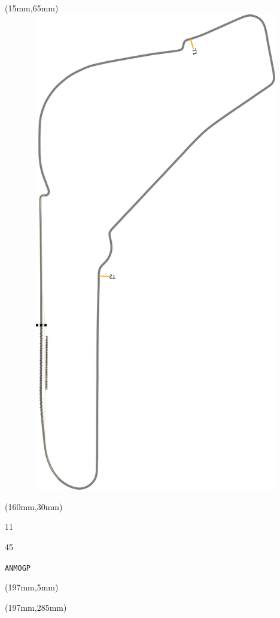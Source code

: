\begin{textblock*}{185mm}(15mm,65mm)%
\centering
\mbox{\includegraphics[width=185mm,height=210mm,keepaspectratio]{PT/ANMOGP.pdf}}
\end{textblock*}
\begin{textblock*}{40mm}(160mm,30mm)%
\Large
\par{} 
\par11 
\par45 
\par\hfill\tiny\tt ANMOGP\\
\end{textblock*}
\begin{textblock*}{20mm}(197mm,5mm)%
\fbox{\thepage}
\label{ANMOGP}
\end{textblock*}
\begin{textblock*}{20mm}(197mm,285mm)%
\fbox{\thepage}
\end{textblock*}

